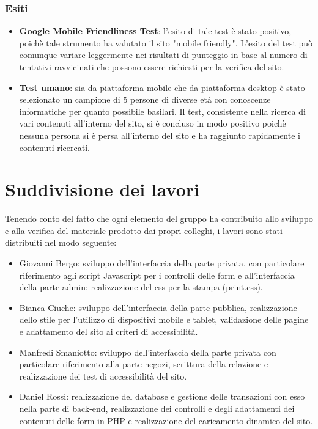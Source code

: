 \documentclass[a4paper,12pt]{article}
\begin{document}
\subsubsection{Esiti}
\begin{itemize}
	\item \textbf{Google Mobile Friendliness Test}: l'esito di tale test è stato positivo, poichè tale strumento ha valutato il sito "mobile friendly". L'esito del test può comunque variare leggermente nei risultati di punteggio in base al numero di tentativi ravvicinati che possono essere richiesti per la verifica del sito.
	\item \textbf{Test umano}: sia da piattaforma mobile che da piattaforma desktop è stato selezionato un campione di 5 persone di diverse età con conoscenze informatiche per quanto possibile basilari. Il test, consistente nella ricerca di vari contenuti all'interno del sito, si è concluso in modo positivo poichè nessuna persona si è persa all'interno del sito e ha raggiunto rapidamente i contenuti ricercati.
\end{itemize}
\newpage
\section{Suddivisione dei lavori}
Tenendo conto del fatto che ogni elemento del gruppo ha contribuito allo sviluppo e alla verifica del materiale prodotto dai propri colleghi, i lavori sono stati distribuiti nel modo seguente:
\begin{itemize}
	\item Giovanni Bergo: sviluppo dell'interfaccia della parte privata, con particolare riferimento agli script Javascript per i controlli delle form e all'interfaccia della parte admin; realizzazione del css per la stampa (print.css).
	\item Bianca Ciuche: sviluppo dell'interfaccia della parte pubblica, realizzazione dello stile per l'utilizzo di dispositivi mobile e tablet, validazione delle pagine e adattamento del sito ai criteri di accessibilità.
	\item Manfredi Smaniotto: sviluppo dell'interfaccia della parte privata con particolare riferimento alla parte negozi, scrittura della relazione e realizzazione dei test di accessibilità del sito.
	\item Daniel Rossi: realizzazione del database e gestione delle transazioni con esso nella parte di back-end, realizzazione dei controlli e degli adattamenti dei contenuti delle form in PHP e realizzazione del caricamento dinamico del sito.
\end{itemize}
\end{document}
